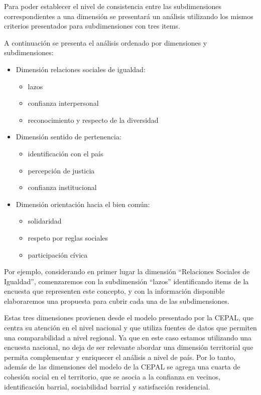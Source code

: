 \documentclass[
  12pt,
]{book}
\providecommand{\tightlist}{%
  \setlength{\itemsep}{0pt}\setlength{\parskip}{0pt}}
\begin{document}
Para poder establecer el nivel de consistencia entre las subdimensiones correspondientes a una dimensión se presentará un análisis utilizando los mismos criterios presentados para subdimensiones con tres items.

A continuación se presenta el análisis ordenado por dimensiones y subdimensiones:

\begin{itemize}
\tightlist
\item
  Dimensión relaciones sociales de igualdad:

  \begin{itemize}
  \tightlist
  \item
    lazos
  \item
    confianza interpersonal
  \item
    reconocimiento y respecto de la diversidad
  \end{itemize}
\item
  Dimensión sentido de pertenencia:

  \begin{itemize}
  \tightlist
  \item
    identificación con el país
  \item
    percepción de justicia
  \item
    confianza institucional
  \end{itemize}
\item
  Dimensión orientación hacia el bien común:

  \begin{itemize}
  \tightlist
  \item
    solidaridad
  \item
    respeto por reglas sociales
  \item
    participación cívica
  \end{itemize}
\end{itemize}

Por ejemplo, considerando en primer lugar la dimensión ``Relaciones Sociales de Igualdad'', comenzaremos con la subdimensión ``lazos'' identificando items de la encuesta que representen este concepto, y con la información disponible elaboraremos una propuesta para cubrir cada una de las subdimensiones.

Estas tres dimensiones provienen desde el modelo presentado por la CEPAL, que centra su atención en el nivel nacional y que utiliza fuentes de datos que permiten una comparabilidad a nivel regional. Ya que en este caso estamos utilizando una encuesta nacional, no deja de ser relevante abordar una dimensión territorial que permita complementar y enriquecer el análisis a nivel de país. Por lo tanto, además de las dimensiones del modelo de la CEPAL se agrega una cuarta de cohesión social en el territorio, que se asocia a la confianza en vecinos, identificación barrial, sociabilidad barrial y satisfacción residencial.
\end{document}
